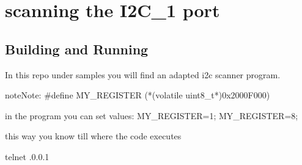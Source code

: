 \documentclass[letterpaper,10pt,english]{sphinxmanual}
\begin{document}
\chapter{scanning the I2C\_1 port}
\label{\detokenize{hacking/i2cscanning:scanning-the-i2c-1-port}}\label{\detokenize{hacking/i2cscanning:i2cscanning}}\label{\detokenize{hacking/i2cscanning::doc}}
\begin{sphinxVerbatim}[commandchars=\\\{\}]
       
       
              
        
\end{sphinxVerbatim}


\section{Building and Running}
\label{\detokenize{hacking/i2cscanning:building-and-running}}
In this repo under samples you will find an adapted i2c scanner program.

\begin{sphinxVerbatim}[commandchars=\\\{\}]
\end{sphinxVerbatim}

\begin{sphinxadmonition}{note}{Note:}
\#define MY\_REGISTER (*(volatile uint8\_t*)0x2000F000)

in the program you can set values:
MY\_REGISTER=1;
MY\_REGISTER=8;

this way you know till where the code executes
\end{sphinxadmonition}

\begin{sphinxVerbatim}[commandchars=\\\{\}]
telnet .0.0.1 
\end{sphinxVerbatim}
\end{document}
